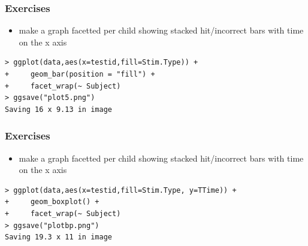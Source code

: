 \documentclass[xcolor={table},c]{beamer}
\begin{document}
\begin{frame}[fragile]\frametitle{Exercises}
  \begin{itemize}
  \item make a graph facetted per child showing stacked hit/incorrect bars with time on the x axis
  \end{itemize}
\begin{verbatim}
> ggplot(data,aes(x=testid,fill=Stim.Type)) +
+     geom_bar(position = "fill") +
+     facet_wrap(~ Subject)
> ggsave("plot5.png")
Saving 16 x 9.13 in image
\end{verbatim}
\begin{center}
\end{center}
\end{frame}


\begin{frame}[fragile]\frametitle{Exercises}
  \begin{itemize}
  \item make a graph facetted per child showing stacked hit/incorrect bars with time on the x axis
  \end{itemize}
\begin{verbatim}
> ggplot(data,aes(x=testid,fill=Stim.Type, y=TTime)) +
+     geom_boxplot() +
+     facet_wrap(~ Subject)
> ggsave("plotbp.png")
Saving 19.3 x 11 in image
\end{verbatim}
\begin{center}
\end{center}
\end{frame}
\end{document}
